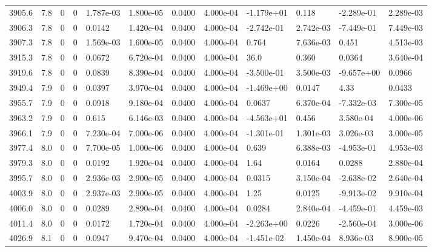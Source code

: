 \documentclass[preview]{standalone}
\begin{document}
{{{{{{{{{{\begin{tabular}{L{1.2cm}C{1.2cm} C{0.3cm}C{0.5cm} C{1.4cm}C{1.4cm} C{1.4cm}C{1.4cm} C{1.6cm}C{1.6cm} C{1.6cm}C{1.6cm}}
  3905.6  &   7.8  & 0     &  0 &  1.787e-03  & 1.800e-05  &  0.0400&   4.000e-04& -1.179e+01 & 0.118   &  -2.289e-01 & 2.289e-03  \\ 
  3906.3  &   7.8  & 0     &  0 &  0.0142  & 1.420e-04  &  0.0400&   4.000e-04& -2.742e-01 & 2.742e-03   &  -7.449e-01 & 7.449e-03  \\ 
  3907.3  &   7.8  & 0     &  0 &  1.569e-03  & 1.600e-05  &  0.0400&   4.000e-04& 0.764 & 7.636e-03   &  0.451 & 4.513e-03  \\ 
  3915.3  &   7.8  & 0     &  0 &  0.0672  & 6.720e-04  &  0.0400&   4.000e-04& 36.0 & 0.360   &  0.0364 & 3.640e-04  \\ 
  3919.6  &   7.8  & 0     &  0 &  0.0839  & 8.390e-04  &  0.0400&   4.000e-04& -3.500e-01 & 3.500e-03   &  -9.657e+00 & 0.0966  \\ 
  3949.4  &   7.9  & 0     &  0 &  0.0397  & 3.970e-04  &  0.0400&   4.000e-04& -1.469e+00 & 0.0147   &  4.33 & 0.0433  \\ 
  3955.7  &   7.9  & 0     &  0 &  0.0918  & 9.180e-04  &  0.0400&   4.000e-04& 0.0637 & 6.370e-04   &  -7.332e-03 & 7.300e-05  \\ 
  3963.2  &   7.9  & 0     &  0 &  0.615  & 6.146e-03  &  0.0400&   4.000e-04& -4.563e+01 & 0.456   &  3.580e-04 & 4.000e-06  \\ 
  3966.1  &   7.9  & 0     &  0 &  7.230e-04  & 7.000e-06  &  0.0400&   4.000e-04& -1.301e-01 & 1.301e-03   &  3.026e-03 & 3.000e-05  \\ 
  3977.4  &   8.0  & 0     &  0 &  7.700e-05  & 1.000e-06  &  0.0400&   4.000e-04& 0.639 & 6.388e-03   &  -4.953e-01 & 4.953e-03  \\ 
  3979.3  &   8.0  & 0     &  0 &  0.0192  & 1.920e-04  &  0.0400&   4.000e-04& 1.64 & 0.0164   &  0.0288 & 2.880e-04  \\ 
  3995.7  &   8.0  & 0     &  0 &  2.936e-03  & 2.900e-05  &  0.0400&   4.000e-04& 0.0315 & 3.150e-04   &  -2.638e-02 & 2.640e-04  \\ 
  4003.9  &   8.0  & 0     &  0 &  2.937e-03  & 2.900e-05  &  0.0400&   4.000e-04& 1.25 & 0.0125   &  -9.913e-02 & 9.910e-04  \\ 
  4006.0  &   8.0  & 0     &  0 &  0.0289  & 2.890e-04  &  0.0400&   4.000e-04& 0.0284 & 2.840e-04   &  -4.459e-01 & 4.459e-03  \\ 
  4011.4  &   8.0  & 0     &  0 &  0.0172  & 1.720e-04  &  0.0400&   4.000e-04& -2.263e+00 & 0.0226   &  -2.560e-04 & 3.000e-06  \\ 
  4026.9  &   8.1  & 0     &  0 &  0.0947  & 9.470e-04  &  0.0400&   4.000e-04& -1.451e-02 & 1.450e-04   &  8.936e-03 & 8.900e-05  \\ 

\end{tabular}}}}}}}}}}}
\end{document}
